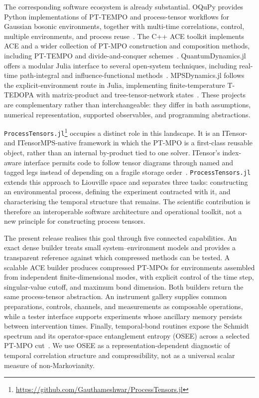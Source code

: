 The corresponding software ecosystem is already substantial.  OQuPy provides Python implementations of PT-TEMPO and process-tensor workflows for Gaussian bosonic environments, together with multi-time correlations, control, multiple environments, and process reuse~\cite{Fux2024}.  The C++ ACE toolkit implements ACE and a wider collection of PT-MPO construction and composition methods, including PT-TEMPO and divide-and-conquer schemes~\cite{CygorekGauger2024}.  QuantumDynamics.jl offers a modular Julia interface to several open-system techniques, including real-time path-integral and influence-functional methods~\cite{Bose2023}.  MPSDynamics.jl follows the explicit-environment route in Julia, implementing finite-temperature T-TEDOPA with matrix-product and tree-tensor-network states~\cite{Lacroix2024}.  These projects are complementary rather than interchangeable: they differ in bath assumptions, numerical representation, supported observables, and programming abstractions.

\texttt{ProcessTensors.jl}\footnote{\url{https://github.com/Gauthameshwar/ProcessTensors.jl}} occupies a distinct role in this landscape.  It is an ITensor- and ITensorMPS-native framework in which the PT-MPO is a first-class reusable object, rather than an internal by-product tied to one solver.  ITensor's index-aware interface permits code to follow tensor diagrams through named and tagged legs instead of depending on a fragile storage order~\cite{Fishman2022}.  \texttt{ProcessTensors.jl} extends this approach to Liouville space and separates three tasks: constructing an environmental process, defining the experiment contracted with it, and characterising the temporal structure that remains.  The scientific contribution is therefore an interoperable software architecture and operational toolkit, not a new principle for constructing process tensors.

The present release realises this goal through five connected capabilities.  An exact dense builder treats small system--environment models and provides a transparent reference against which compressed methods can be tested.  A scalable ACE builder produces compressed PT-MPOs for environments assembled from independent finite-dimensional modes, with explicit control of the time step, singular-value cutoff, and maximum bond dimension.  Both builders return the same process-tensor abstraction.  An instrument gallery supplies common preparations, controls, channels, and measurements as composable operations, while a tester interface supports experiments whose ancillary memory persists between intervention times.  Finally, temporal-bond routines expose the Schmidt spectrum and its operator-space entanglement entropy (OSEE) across a selected PT-MPO cut~\cite{Prosen2007}.  We use OSEE as a representation-dependent diagnostic of temporal correlation structure and compressibility, not as a universal scalar measure of non-Markovianity.

